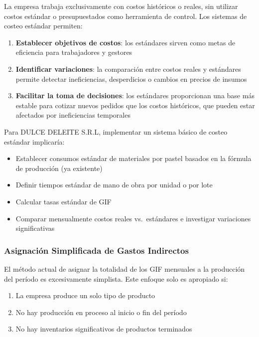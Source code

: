 \documentclass[
  stu,
  floatsintext,
  longtable,
  a4paper,
  nolmodern,
  notxfonts,
  notimes,
  12pt,
  colorlinks=true,linkcolor=blue,citecolor=blue,urlcolor=blue]{apa7}
\providecommand{\tightlist}{%
  \setlength{\itemsep}{0pt}\setlength{\parskip}{0pt}}
\begin{document}
La empresa trabaja exclusivamente con costos históricos o reales, sin
utilizar costos estándar o presupuestados como herramienta de control.
Los sistemas de costeo estándar permiten:

\begin{enumerate}
\def\labelenumi{\arabic{enumi}.}
\item
  \textbf{Establecer objetivos de costos}: los estándares sirven como
  metas de eficiencia para trabajadores y gestores
\item
  \textbf{Identificar variaciones}: la comparación entre costos reales y
  estándares permite detectar ineficiencias, desperdicios o cambios en
  precios de insumos
\item
  \textbf{Facilitar la toma de decisiones}: los estándares proporcionan
  una base más estable para cotizar nuevos pedidos que los costos
  históricos, que pueden estar afectados por ineficiencias temporales
\end{enumerate}

Para DULCE DELEITE S.R.L, implementar un sistema básico de costeo
estándar implicaría:

\begin{itemize}
\tightlist
\item
  Establecer consumos estándar de materiales por pastel basados en la
  fórmula de producción (ya existente)
\item
  Definir tiempos estándar de mano de obra por unidad o por lote
\item
  Calcular tasas estándar de GIF
\item
  Comparar mensualmente costos reales vs.~estándares e investigar
  variaciones significativas
\end{itemize}

\subsubsection{Asignación Simplificada de Gastos
Indirectos}\label{asignaciuxf3n-simplificada-de-gastos-indirectos}

El método actual de asignar la totalidad de los GIF mensuales a la
producción del período es excesivamente simplista. Este enfoque solo es
apropiado si:

\begin{enumerate}
\def\labelenumi{\arabic{enumi}.}
\tightlist
\item
  La empresa produce un solo tipo de producto
\item
  No hay producción en proceso al inicio o fin del período
\item
  No hay inventarios significativos de productos terminados
\end{enumerate}
\end{document}
